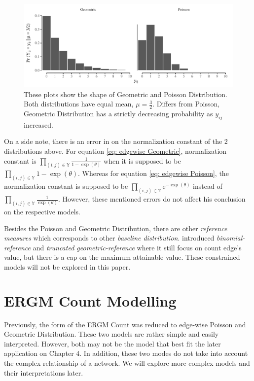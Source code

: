 \documentclass[12pt,a4paper,twoside,openany]{book}
\makeatletter
\def\maxwidth{ %
  \ifdim\Gin@nat@width>\linewidth
    \linewidth
  \else
    \Gin@nat@width
  \fi
}
\newenvironment{knitrout}{}{} %
\newcommand{\me}{\mathrm{e}}
\makeatother
\begin{document}
\begin{figure}[H] 
\begin{knitrout}
\color{fgcolor}

{\centering \includegraphics[width=\maxwidth]{figure/geom_pois-1} 

}



\end{knitrout}
\caption [Geometric and Poisson Distribution with Mean = 3.5]{These plots show the shape of Geometric and Poisson Distribution. Both distributions have equal mean, $\mu = \frac{3}{2}$. Differs from Poisson, Geometric Distribution has a strictly decreasing probability as $y_{ij}$ increased.}
\label{fig: Geometric and Poisson}
\end{figure}

On a side note, there is an error in \citet{countergmdefined} on the normalization constant of the 2 distributions above. 
For equation \ref{eq: edgewise Geometric}, \citet{countergmdefined} normalization constant is $\prod_{(i,j) \in \mathbb{Y}}\frac{1}{1-\exp(\theta)}$ when it is supposed to be  $\prod_{(i,j) \in \mathbb{Y}}1-\exp(\theta)$.
Whereas for equation \ref{eq: edgewise Poisson}, the normalization constant is supposed to be $\prod_{(i,j) \in \mathbb{Y}} \me^{-\exp(\theta)}$ instead of $\prod_{(i,j) \in \mathbb{Y}}\frac{1}{\exp(\theta)}$. 
However, these mentioned errors do not affect his conclusion on the respective models.

Besides the Poisson and Geometric Distribution, there are other \textit{reference measures} which corresponds to other \textit{baseline distribution}.
\citet{countergmapplied} introduced \textit{binomial-reference} and \textit{truncated geometric-reference} where it still focus on count edge's value, but there is a cap on the maximum attainable value.  
These constrained models will not  be explored in this paper.

\section{ERGM Count Modelling}
Previously, the form of the ERGM Count was reduced to edge-wise Poisson and Geometric Distribution. 
These two models are rather simple and easily interpreted. 
However, both may not be the model that best fit the later application on Chapter 4.
In addition, these two modes do not take into account the complex relationship of a network.
We will explore more complex models and their interpretations later.
\end{document}

